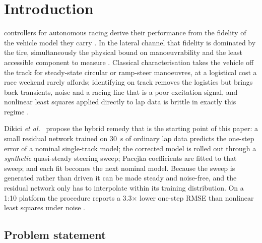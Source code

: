 \section{Introduction}

 controllers for autonomous racing derive their
performance from the fidelity of the vehicle model they carry
\cite{liniger2015,kabzan2019lbmpc,forzaeth2024}. In the lateral channel that
fidelity is dominated by the tire, simultaneously the physical bound on
manoeuvrability and the least accessible component to measure
\cite{pacejka2012book,amz2020}. Classical characterisation takes the vehicle
off the track for steady-state circular or ramp-steer manoeuvres, at a
logistical cost a race weekend rarely affords; identifying on track removes the
logistics but brings back transients, noise and a racing line that is a poor
excitation signal, and nonlinear least squares applied directly to lap data is
brittle in exactly this regime \cite{ontrack2025}.

Dikici \emph{et al.}~\cite{ontrack2025} propose the hybrid remedy that is the
starting point of this paper: a small residual network trained on
\SI{30}{\second} of ordinary lap data predicts the one-step error of a nominal
single-track model; the corrected model is rolled out through a \emph{synthetic}
quasi-steady steering sweep; Pacejka coefficients are fitted to that sweep; and
each fit becomes the next nominal model. Because the sweep is generated rather
than driven it can be made steady and noise-free, and the residual network only
has to interpolate within its training distribution. On a 1:10 platform the
procedure reports a \num{3.3}$\times$ lower one-step RMSE than nonlinear least
squares under noise \cite{ontrack2025}.

\subsection{Problem statement}

